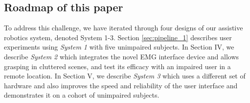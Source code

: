 \subsection{ Roadmap of this paper}

To address this challenge, we have iterated through four designs of our assistive robotics system, denoted System 1-3.  Section \ref{sec:pipeline_1} describes user experiments using \emph{System 1} with five unimpaired subjects. In Section IV, we describe \emph{System 2} which integrates the novel EMG interface device and allows grasping in cluttered scenes, and test its efficacy with an impaired user in a remote location. In Section V, we describe \emph{System 3} which uses a different set of hardware and also improves the speed and reliability of the user interface and demonstrates it on a cohort of unimpaired subjects. 



















